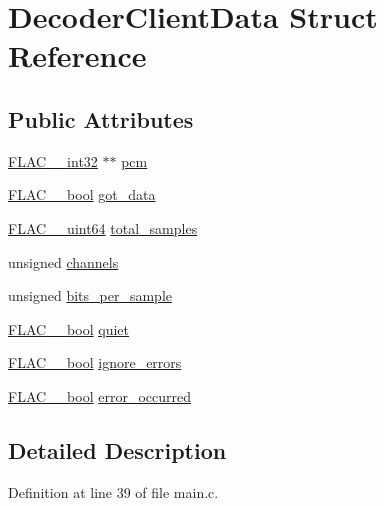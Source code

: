 \hypertarget{struct_decoder_client_data}{}\section{Decoder\+Client\+Data Struct Reference}
\label{struct_decoder_client_data}
\subsection*{Public Attributes}
\begin{DoxyCompactItemize}
\item 
\hyperlink{ordinals_8h_a33fd77bfe6d685541a0c034a75deccdc}{F\+L\+A\+C\+\_\+\+\_\+int32} $\ast$$\ast$ \hyperlink{struct_decoder_client_data_af9764f291cb5dffa18770292499ac90b}{pcm}
\item 
\hyperlink{ordinals_8h_a95103469f1cbd78b8cf250194985b34e}{F\+L\+A\+C\+\_\+\+\_\+bool} \hyperlink{struct_decoder_client_data_afd933a69af0ab1a785439bc3c2db636a}{got\+\_\+data}
\item 
\hyperlink{ordinals_8h_aa78c8c70a3eb8a58af7436f278acde8e}{F\+L\+A\+C\+\_\+\+\_\+uint64} \hyperlink{struct_decoder_client_data_a2668fbf4f29f34cf1ca74abfe0454b37}{total\+\_\+samples}
\item 
unsigned \hyperlink{struct_decoder_client_data_a97c807bb8c0974255fc26115dfbaf69c}{channels}
\item 
unsigned \hyperlink{struct_decoder_client_data_a223609fa36d44fec5aef49aee5fdf095}{bits\+\_\+per\+\_\+sample}
\item 
\hyperlink{ordinals_8h_a95103469f1cbd78b8cf250194985b34e}{F\+L\+A\+C\+\_\+\+\_\+bool} \hyperlink{struct_decoder_client_data_af0032c4e37c763ec147dd06a648dd15e}{quiet}
\item 
\hyperlink{ordinals_8h_a95103469f1cbd78b8cf250194985b34e}{F\+L\+A\+C\+\_\+\+\_\+bool} \hyperlink{struct_decoder_client_data_a0e7e18a3cd27e895bb78c54b8ddc5734}{ignore\+\_\+errors}
\item 
\hyperlink{ordinals_8h_a95103469f1cbd78b8cf250194985b34e}{F\+L\+A\+C\+\_\+\+\_\+bool} \hyperlink{struct_decoder_client_data_af674c1095df5e045ec4cea9266de84f5}{error\+\_\+occurred}
\end{DoxyCompactItemize}


\subsection{Detailed Description}


Definition at line 39 of file main.\+c.



